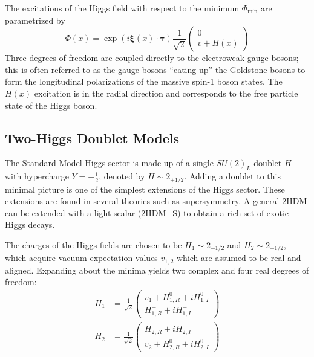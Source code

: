 \documentclass{article}
\begin{document}
The excitations of the Higgs field with respect to the minimum $\Phi_{\text{min}}$ are parametrized by 
\begin{equation}
    \Phi(x) = \exp(i \boldsymbol{\xi}(x) \cdot \boldsymbol{\tau}) \frac{1}{\sqrt{2}} \begin{pmatrix} 0 \\ v + H(x) \end{pmatrix}
\end{equation}
Three degrees of freedom are coupled directly to the electroweak gauge bosons; this is often referred to as the gauge bosons ``eating up'' the Goldstone bosons to form the longitudinal polarizations of the massive spin-1 boson states. The $H(x)$ excitation is in the radial direction and corresponds to the free particle state of the Higgs boson. 

\subsection{Two-Higgs Doublet Models}

 

The Standard Model Higgs sector is made up of a single $SU(2)_L$ doublet $H$ with hypercharge $Y = +\frac{1}{2}$, denoted by $H \sim 2_{+1/2}$. Adding a doublet to this minimal picture is one of the simplest extensions of the Higgs sector. These extensions are found in several theories such as supersymmetry. A general 2HDM can be extended with a light scalar (2HDM+S) to obtain a rich set of exotic Higgs decays. 

The charges of the Higgs fields are chosen to be $H_1 \sim 2_{-1/2}$ and $H_2 \sim 2_{+1/2}$, which acquire vacuum expectation values $v_{1,2}$ which are assumed to be real and aligned. Expanding about the minima yields two complex and four real degrees of freedom:
\begin{align}
    H_1 &= \frac{1}{\sqrt{2}} \begin{pmatrix} v_1 + H^{0}_{1, R} + iH^0_{1, I} \\  
                                              H^-_{1,R} + i H^-_{1, I}   \end{pmatrix} \\
    H_2 &= \frac{1}{\sqrt{2}} \begin{pmatrix} H^+_{2, R} + iH^+_{2, I} \\  
                                              v_2 + H^0_{2,R} + i H^0_{2, I}   \end{pmatrix} \\
\end{align}
\end{document}
